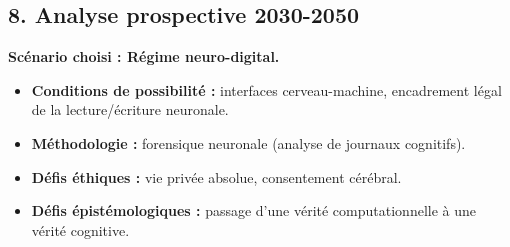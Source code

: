 \documentclass[12pt,a4paper]{article}
\begin{document}
	\subsection*{8. Analyse prospective 2030-2050}
	
	\textbf{Scénario choisi : Régime neuro-digital.}
	
	\begin{itemize}
		\item \textbf{Conditions de possibilité :} interfaces cerveau-machine, encadrement légal de la lecture/écriture neuronale.
		\item \textbf{Méthodologie :} forensique neuronale (analyse de journaux cognitifs).
		\item \textbf{Défis éthiques :} vie privée absolue, consentement cérébral.
		\item \textbf{Défis épistémologiques :} passage d’une vérité computationnelle à une vérité cognitive.
	\end{itemize}
	
\end{document}

